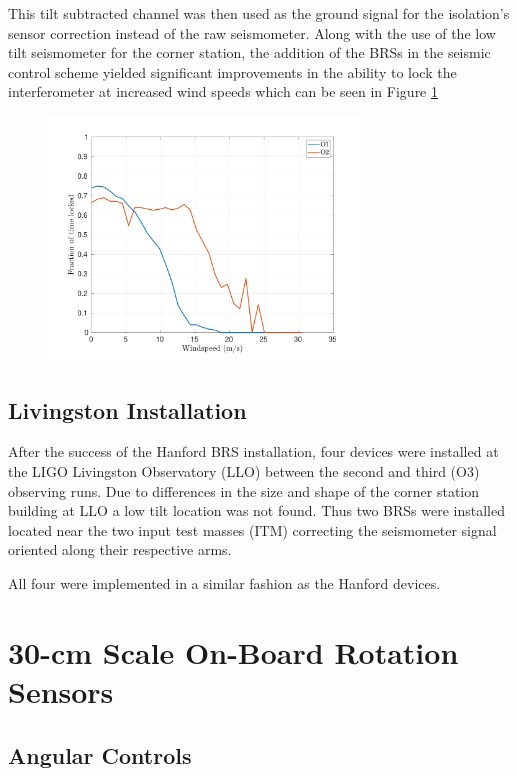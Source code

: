 \documentclass [12pt, proquest]{uwthesis}[2019]
\begin{document}
This tilt subtracted channel was then used as the ground signal for the isolation's sensor correction instead of the raw seismometer. Along with the use of the low tilt seismometer for the corner station, the addition of the BRSs in the seismic control scheme yielded significant improvements in the ability to lock the interferometer at increased wind speeds which can be seen in Figure \ref{O2}

\begin{figure}%
\begin{center}
\includegraphics[width=0.75\textwidth]{Wind_LockedFraction_total.pdf}
\caption{}
\label{O2}
\end{center}
\end{figure}

\section{Livingston Installation}

\quad After the success of the Hanford BRS installation, four devices were installed at the LIGO Livingston Observatory (LLO) between the second and third (O3) observing runs. Due to differences in the size and shape of the corner station building at LLO a low tilt location was not found. Thus two BRSs were installed located near the two input test masses (ITM) correcting the seismometer signal oriented along their respective arms. 

All four were implemented in a similar fashion as the Hanford devices.

\chapter{30-cm Scale On-Board Rotation Sensors}
\section{Angular Controls}
\end{document}
